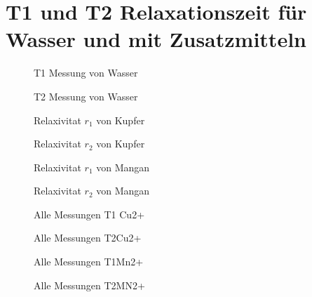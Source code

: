 \section{T1 und T2 Relaxationszeit für Wasser und mit Zusatzmitteln}
\begin{figure}[H]
    \centering
    
    \caption{T1 Messung von Wasser}
\end{figure}

\begin{figure}[H]
    \centering
    
    \caption{T2 Messung von Wasser}
\end{figure}

\begin{figure}[H]
    \centering
    
    \caption{Relaxivitat $r_1$ von Kupfer}
\end{figure}

\begin{figure}[H]
    \centering
    
    \caption{Relaxivitat $r_2$ von Kupfer}
\end{figure}

\begin{figure}[H]
    \centering
    
    \caption{Relaxivitat $r_1$ von Mangan}
\end{figure}

\begin{figure}[H]
    \centering
    
    \caption{Relaxivitat $r_2$ von Mangan}
\end{figure}

\begin{figure}[H]
    \centering
    
    \caption{Alle Messungen T1 Cu2+}
\end{figure}
\begin{figure}[H]
    \centering
    
    \caption{Alle Messungen T2Cu2+}
\end{figure}
\begin{figure}[H]
    \centering
    
    \caption{Alle Messungen T1Mn2+}
\end{figure}
\begin{figure}[H]
    \centering
    
    \caption{Alle Messungen T2MN2+}
\end{figure}


